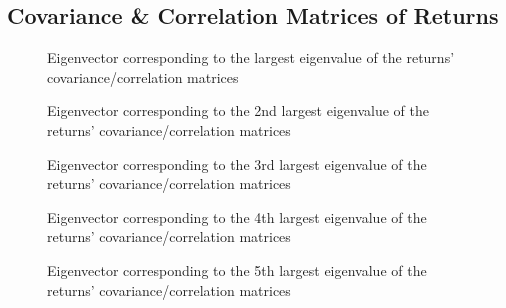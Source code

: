 \documentclass{article}
\begin{document}
\subsection{Covariance \& Correlation Matrices of Returns}

\begin{figure}[htb!]
  \centering
  \caption{Eigenvector corresponding to the largest eigenvalue of the returns' covariance/correlation matrices}
\end{figure}

\begin{figure}[htb!]
  \centering
  \caption{Eigenvector corresponding to the 2nd largest eigenvalue of the returns' covariance/correlation matrices}
\end{figure}

\begin{figure}[htb!]
  \centering
  \caption{Eigenvector corresponding to the 3rd largest eigenvalue of the returns' covariance/correlation matrices}
\end{figure}

\begin{figure}[htb!]
  \centering
  \caption{Eigenvector corresponding to the 4th largest eigenvalue of the returns' covariance/correlation matrices}
\end{figure}

\begin{figure}[htb!]
  \centering
  \caption{Eigenvector corresponding to the 5th largest eigenvalue of the returns' covariance/correlation matrices}
\end{figure}
\end{document}
